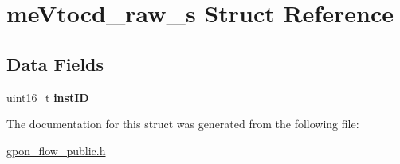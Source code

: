 \hypertarget{structmeVtocd__raw__s}{}\section{me\+Vtocd\+\_\+raw\+\_\+s Struct Reference}
\label{structmeVtocd__raw__s}
\subsection*{Data Fields}
\begin{DoxyCompactItemize}
\item 
\mbox{\label{structmeVtocd__raw__s_a0a752c7a41ed29bf0e8ecaab9333cc08}} 
uint16\+\_\+t {\bfseries inst\+ID}
\end{DoxyCompactItemize}


The documentation for this struct was generated from the following file\+:\begin{DoxyCompactItemize}
\item 
\hyperlink{gpon__flow__public_8h}{gpon\+\_\+flow\+\_\+public.\+h}\end{DoxyCompactItemize}
